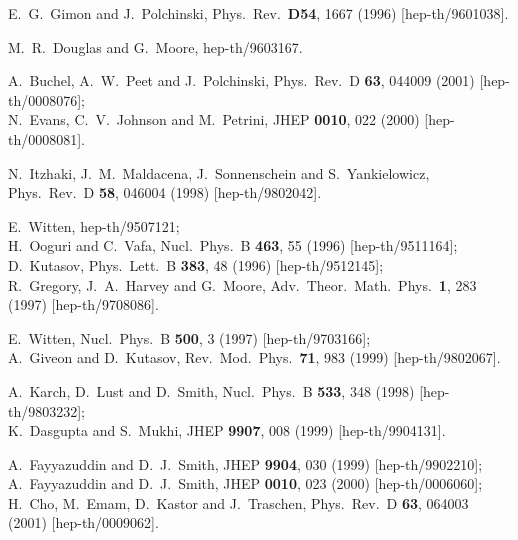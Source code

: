 \documentclass[a4paper,12pt]{article}
\renewcommand{\=}[1]{\bar{#1}}
\begin{document}
\begin{thebibliography}{10}
E.~G.~Gimon and J.~Polchinski,
Phys.\ Rev.\  {\bf D54}, 1667 (1996)
[hep-th/9601038].

M.~R.~Douglas and G.~Moore,
hep-th/9603167.

A.~Buchel, A.~W.~Peet and J.~Polchinski,
Phys.\ Rev.\ D {\bf 63}, 044009 (2001)
[hep-th/0008076];\\
N.~Evans, C.~V.~Johnson and M.~Petrini,
JHEP {\bf 0010}, 022 (2000)
[hep-th/0008081].

N.~Itzhaki, J.~M.~Maldacena, J.~Sonnenschein and S.~Yankielowicz,
Phys.\ Rev.\ D {\bf 58}, 046004 (1998)
[hep-th/9802042].

E.~Witten,
hep-th/9507121;\\
H.~Ooguri and C.~Vafa,
Nucl.\ Phys.\ B {\bf 463}, 55 (1996)
[hep-th/9511164];\\
D.~Kutasov,
Phys.\ Lett.\ B {\bf 383}, 48 (1996)
[hep-th/9512145];\\
R.~Gregory, J.~A.~Harvey and G.~Moore,
Adv.\ Theor.\ Math.\ Phys.\  {\bf 1}, 283 (1997)
[hep-th/9708086].

E.~Witten,
Nucl.\ Phys.\ B {\bf 500}, 3 (1997)
[hep-th/9703166];\\
A.~Giveon and D.~Kutasov,
Rev.\ Mod.\ Phys.\  {\bf 71}, 983 (1999)
[hep-th/9802067].

A.~Karch, D.~Lust and D.~Smith,
Nucl.\ Phys.\ B {\bf 533}, 348 (1998)
[hep-th/9803232];\\
K.~Dasgupta and S.~Mukhi,
JHEP {\bf 9907}, 008 (1999)
[hep-th/9904131].

A.~Fayyazuddin and D.~J.~Smith,
JHEP {\bf 9904}, 030 (1999)
[hep-th/9902210];\\
A.~Fayyazuddin and D.~J.~Smith,
JHEP {\bf 0010}, 023 (2000)
[hep-th/0006060];\\
H.~Cho, M.~Emam, D.~Kastor and J.~Traschen,
Phys.\ Rev.\ D {\bf 63}, 064003 (2001)
[hep-th/0009062].

\end{thebibliography}
\end{document}
